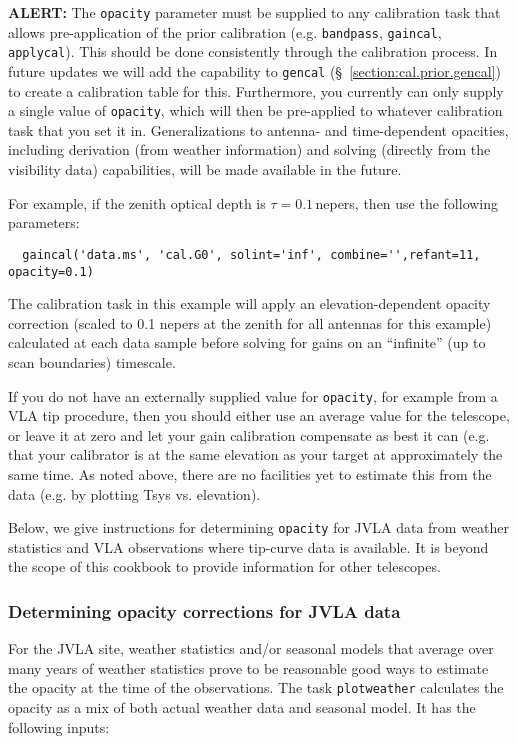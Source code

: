 {\bf ALERT:} The {\tt opacity} parameter must be supplied
to any calibration task that allows pre-application of the prior
calibration (e.g. {\tt bandpass}, {\tt gaincal}, {\tt applycal}).
This should be done consistently through the calibration process.
In future updates we will add the capability to {\tt gencal}
(\S~\ref{section:cal.prior.gencal}) to create a calibration table for this.
Furthermore, you currently can only supply a single value
of {\tt opacity}, which will then be pre-applied to whatever 
calibration task that you set it in.
Generalizations to antenna- and time-dependent opacities, including
derivation (from weather information) and solving (directly from the
visibility data) capabilities, will be made available in the future.

For example, if the zenith optical depth is $\tau=0.1$\,nepers, then
use the following parameters:
\small
\begin{verbatim}
  gaincal('data.ms', 'cal.G0', solint='inf', combine='',refant=11, opacity=0.1)
\end{verbatim}
\normalsize
The calibration task in this example will apply an
elevation-dependent opacity correction (scaled to 0.1 nepers at the
zenith for all antennas for this example) calculated at each 
data sample before solving for gains on an ``infinite'' (up to scan
boundaries) timescale. 

If you do not have an externally supplied value for {\tt opacity}, for
example from a VLA tip procedure, then you should either use an
average value for the telescope, or leave it at zero and let
your gain calibration compensate as best it can (e.g. that your 
calibrator is at the same elevation as your target at approximately 
the same time.
As noted above, there are no facilities yet to estimate this from the
data (e.g. by plotting Tsys vs. elevation).

Below, we give instructions for determining {\tt opacity} for JVLA
data from weather statistics and VLA observations where tip-curve data
is available.  It is beyond the scope of this cookbook to provide
information for other telescopes.

\subsubsection{Determining opacity corrections for JVLA data}
\label{section:cal.prior.opacity.evla}

For the JVLA site, weather statistics and/or seasonal models that
average over many years of weather statistics prove to be reasonable good
ways to estimate the opacity at the time of the observations. The task
{\tt plotweather} calculates the opacity as a mix of both actual
weather data and seasonal model. It has the following inputs: 

